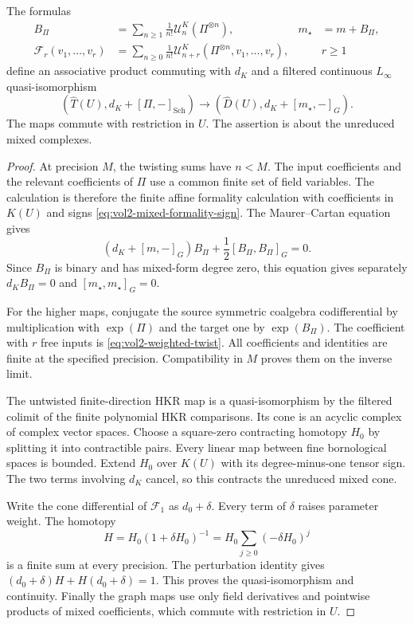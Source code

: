 \begin{theorem}\label{thm:vol2-weighted-relative-formality}
The formulas
\begin{align}
 B_\Pi&=\sum_{n\geq1}\frac1{n!}
              \mathcal U_n^K(\Pi^{\otimes n}),
       &m_\star&=m+B_\Pi,
       \label{eq:vol2-weighted-star}\\
 \mathcal F_r(v_1,\ldots,v_r)
       &=\sum_{n\geq0}\frac1{n!}
           \mathcal U_{n+r}^K
                (\Pi^{\otimes n},v_1,\ldots,v_r),
       &&r\geq1
       \label{eq:vol2-weighted-twist}
\end{align}
define an associative product commuting with $d_K$
and a filtered continuous $L_\infty$ quasi-isomorphism
\[
 (\widehat T(U),d_K+[\Pi,-]_{\mathrm{Sch}})
 \longrightarrow
 (\widehat D(U),d_K+[m_\star,-]_G).
\]
The maps commute with restriction in $U$.
The assertion is about the unreduced mixed complexes.
\end{theorem}
\begin{proof}
At precision $M$, the twisting sums have $n<M$.
The input coefficients and the relevant coefficients
of $\Pi$ use a common finite set of field variables.
The calculation is therefore the finite affine
formality calculation with coefficients in $K(U)$
and signs \eqref{eq:vol2-mixed-formality-sign}.
The Maurer--Cartan equation gives
\[
 (d_K+[m,-]_G)B_\Pi+\frac12[B_\Pi,B_\Pi]_G=0.
\]
Since $B_\Pi$ is binary and has mixed-form degree
zero, this equation gives separately
$d_KB_\Pi=0$ and $[m_\star,m_\star]_G=0$.

For the higher maps, conjugate the source symmetric
coalgebra codifferential by multiplication with
$\exp(\Pi)$ and the target one by $\exp(B_\Pi)$.
The coefficient with $r$ free inputs is
\eqref{eq:vol2-weighted-twist}.
All coefficients and identities are finite at
the specified precision. Compatibility in $M$
proves them on the inverse limit.

The untwisted finite-direction HKR map is a
quasi-isomorphism by the filtered colimit of the
finite polynomial HKR comparisons.
Its cone is an acyclic complex of complex vector
spaces. Choose a square-zero contracting
homotopy $H_0$ by splitting it into contractible
pairs. Every linear map between fine bornological
spaces is bounded.
Extend $H_0$ over $K(U)$ with its degree-minus-one
tensor sign. The two terms involving $d_K$ cancel,
so this contracts the unreduced mixed cone.

Write the cone differential of $\mathcal F_1$ as
$d_0+\delta$. Every term of $\delta$ raises
parameter weight.
The homotopy
\[
 H=H_0(1+\delta H_0)^{-1}
   =H_0\sum_{j\geq0}(-\delta H_0)^j
\]
is a finite sum at every precision.
The perturbation identity gives
$(d_0+\delta)H+H(d_0+\delta)=1$.
This proves the quasi-isomorphism and continuity.
Finally the graph maps use only field derivatives
and pointwise products of mixed coefficients,
which commute with restriction in $U$.
\end{proof}

